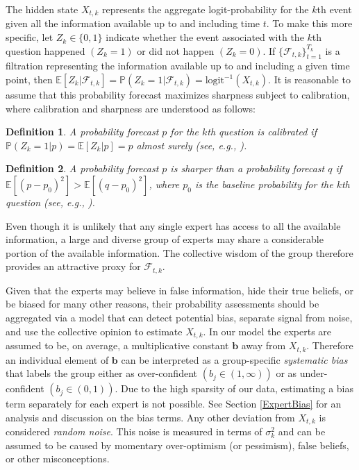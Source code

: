 \documentclass[aoas, preprint]{imsart}
\numberwithin{equation}{section}
\theoremstyle{plain}
\newtheorem{mydef}{Definition}
\renewcommand{\P}{\mathbb{P}}
\newcommand{\E}{\mathbb{E}}
\newcommand{\logit}{\text{logit}}
\begin{document}
The hidden state $X_{t,k}$ represents the aggregate logit-probability for the $k$th event given all the information available up to and including time $t$. To make this more specific, let $Z_k \in \{0, 1\}$ indicate whether the event associated with the $k$th question happened $\left(Z_k = 1\right)$ or did not happen $\left(Z_k = 0\right)$. If $\{\mathcal{F}_{t,k}\}_{t=1}^{T_k}$ is a filtration representing the information available up to and including a given time point, then $\E[Z_k | \mathcal{F}_{t,k}] = \P(Z_k = 1| \mathcal{F}_{t,k}) = \logit^{-1}(X_{t,k})$. It is reasonable to assume that this probability forecast 
maximizes sharpness subject to calibration, where calibration and sharpness are understood as follows:
\begin{mydef}
A probability forecast $p$ for the $k$th question is calibrated if $\P(Z_k = 1 | p) = \E[Z_k | p] = p$ almost surely (see, e.g., \citet{murphy1987general}).
\end{mydef}
\begin{mydef}
A probability forecast $p$ is sharper than a probability forecast $q$ if $\E[(p-p_0)^2] > \E[(q-p_0)^2]$, where $p_0$ is the baseline probability for the $k$th question (see, e.g., \citet{ranjan2009combining}). 
\end{mydef}
\noindent
Even though it is unlikely that any single expert has access to all the available information, a large and diverse group of experts may share a considerable portion of the available information. The collective wisdom of the group therefore provides an attractive proxy for $\mathcal{F}_{t,k}$. 


Given that the experts may believe in false information, hide their true beliefs, or be biased for many other reasons, their probability assessments should be aggregated via a model that can detect potential bias, separate signal from noise, and use the collective opinion to estimate $X_{t,k}$. In our model the experts are assumed to be, on average, a multiplicative constant $\boldsymbol{b}$ away from $X_{t,k}$. Therefore an individual element of $\boldsymbol{b}$ can be interpreted as a group-specific \textit{systematic bias} that labels the group either as over-confident $\left( b_j \in (1, \infty)\right)$ or as under-confident $\left(b_j \in (0,1)\right)$.  Due to the high sparsity of our data, estimating a bias term separately for each expert is not possible. See Section \ref{ExpertBias} for an analysis and discussion on the bias terms. Any other deviation from $X_{t,k}$ is considered \textit{random noise}. This noise is measured in terms of $\sigma^2_k$ and can be assumed to be caused by momentary over-optimism (or pessimism), false beliefs, or other misconceptions. 
 
\end{document}

